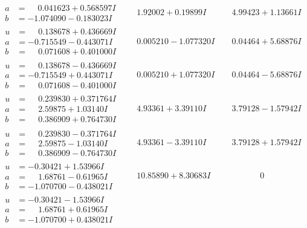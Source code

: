 \documentclass[1p]{elsarticle_modified}
\theoremstyle{definition}
\begin{document}
$$\begin{array}{c|c|c}
\begin{aligned}
a &= \phantom{-}0.041623 + 0.568597 I \\
b &= -1.074090 - 0.183023 I\end{aligned}
 & \phantom{-}1.92002 + 0.19899 I & \phantom{-}4.99423 + 1.13661 I \\ \hline\begin{aligned}
u &= \phantom{-}0.138678 + 0.436669 I \\
a &= -0.715549 - 0.443071 I \\
b &= \phantom{-}0.071608 + 0.401000 I\end{aligned}
 & \phantom{-}0.005210 - 1.077320 I & \phantom{-}0.04464 + 5.68876 I \\ \hline\begin{aligned}
u &= \phantom{-}0.138678 - 0.436669 I \\
a &= -0.715549 + 0.443071 I \\
b &= \phantom{-}0.071608 - 0.401000 I\end{aligned}
 & \phantom{-}0.005210 + 1.077320 I & \phantom{-}0.04464 - 5.68876 I \\ \hline\begin{aligned}
u &= \phantom{-}0.239830 + 0.371764 I \\
a &= \phantom{-}2.59875 + 1.03140 I \\
b &= \phantom{-}0.386909 + 0.764730 I\end{aligned}
 & \phantom{-}4.93361 + 3.39110 I & \phantom{-}3.79128 - 1.57942 I \\ \hline\begin{aligned}
u &= \phantom{-}0.239830 - 0.371764 I \\
a &= \phantom{-}2.59875 - 1.03140 I \\
b &= \phantom{-}0.386909 - 0.764730 I\end{aligned}
 & \phantom{-}4.93361 - 3.39110 I & \phantom{-}3.79128 + 1.57942 I \\ \hline\begin{aligned}
u &= -0.30421 + 1.53966 I \\
a &= \phantom{-}1.68761 - 0.61965 I \\
b &= -1.070700 - 0.438021 I\end{aligned}
 & \phantom{-}10.85890 + 8.30683 I & \phantom{-0.000000 } 0 \\ \hline\begin{aligned}
u &= -0.30421 - 1.53966 I \\
a &= \phantom{-}1.68761 + 0.61965 I \\
b &= -1.070700 + 0.438021 I\end{aligned}

\end{array}$$
\end{document}
